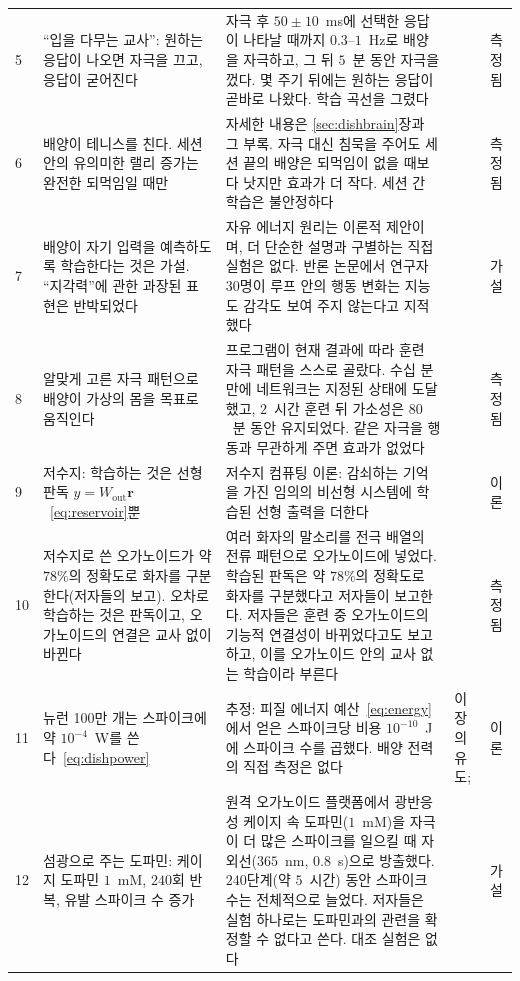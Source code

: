 {\begin{longtable}{>{\raggedright}p{0.5cm}>{\raggedright}p{4.0cm}>{\raggedright}p{5.6cm}>{\raggedright}p{2.3cm}>{\raggedright\arraybackslash}p{1.7cm}}
5 & “입을 다무는 교사”: 원하는 응답이 나오면 자극을 끄고, 응답이 굳어진다 & 자극 후 $50\pm10$~ms에 선택한 응답이 나타날 때까지 $0.3$--$1$~Hz로 배양을 자극하고, 그 뒤 $5$~분 동안 자극을 껐다. 몇 주기 뒤에는 원하는 응답이 곧바로 나왔다. 학습 곡선을 그렸다 & \cite{Shahaf2001} & 측정됨 \\
6 & 배양이 테니스를 친다. 세션 안의 유의미한 랠리 증가는 완전한 되먹임일 때만 & 자세한 내용은 \ref{sec:dishbrain}장과 그 부록. 자극 대신 침묵을 주어도 세션 끝의 배양은 되먹임이 없을 때보다 낫지만 효과가 더 작다. 세션 간 학습은 불안정하다 & \cite{Kagan2022} & 측정됨 \\
7 & 배양이 자기 입력을 예측하도록 학습한다는 것은 가설. “지각력”에 관한 과장된 표현은 반박되었다 & 자유 에너지 원리는 이론적 제안이며, 더 단순한 설명과 구별하는 직접 실험은 없다. 반론 논문에서 연구자 30명이 루프 안의 행동 변화는 지능도 감각도 보여 주지 않는다고 지적했다 & \cite{Friston2010,Balci2023} & 가설 \\
8 & 알맞게 고른 자극 패턴으로 배양이 가상의 몸을 목표로 움직인다 & 프로그램이 현재 결과에 따라 훈련 자극 패턴을 스스로 골랐다. 수십 분 만에 네트워크는 지정된 상태에 도달했고, $2$~시간 훈련 뒤 가소성은 $80$~분 동안 유지되었다. 같은 자극을 행동과 무관하게 주면 효과가 없었다 & \cite{Bakkum2008} & 측정됨 \\
9 & 저수지: 학습하는 것은 선형 판독 $y=W_{\text{out}}\mathbf r$~\eqref{eq:reservoir}뿐 & 저수지 컴퓨팅 이론: 감쇠하는 기억을 가진 임의의 비선형 시스템에 학습된 선형 출력을 더한다 & \cite{Maass2002,JaegerHaas2004} & 이론 \\
10 & 저수지로 쓴 오가노이드가 약 $78\%$의 정확도로 화자를 구분한다(저자들의 보고). 오차로 학습하는 것은 판독이고, 오가노이드의 연결은 교사 없이 바뀐다 & 여러 화자의 말소리를 전극 배열의 전류 패턴으로 오가노이드에 넣었다. 학습된 판독은 약 $78\%$의 정확도로 화자를 구분했다고 저자들이 보고한다. 저자들은 훈련 중 오가노이드의 기능적 연결성이 바뀌었다고도 보고하고, 이를 오가노이드 안의 교사 없는 학습이라 부른다 & \cite{Cai2023} & 측정됨 \\
11 & 뉴런 100만 개는 스파이크에 약 $10^{-4}$~W를 쓴다~\eqref{eq:dishpower} & 추정: 피질 에너지 예산~\eqref{eq:energy}에서 얻은 스파이크당 비용 $10^{-10}$~J에 스파이크 수를 곱했다. 배양 전력의 직접 측정은 없다 & 이 장의 유도; \cite{Attwell2001} & 이론 \\
12 & 섬광으로 주는 도파민: 케이지 도파민 $1$~mM, $240$회 반복, 유발 스파이크 수 증가 & 원격 오가노이드 플랫폼에서 광반응성 케이지 속 도파민($1$~mM)을 자극이 더 많은 스파이크를 일으킬 때 자외선($365$~nm, $0.8$~s)으로 방출했다. $240$단계(약 $5$~시간) 동안 스파이크 수는 전체적으로 늘었다. 저자들은 실험 하나로는 도파민과의 관련을 확정할 수 없다고 쓴다. 대조 실험은 없다 & \cite{Jordan2024} & 가설 \\

\end{longtable}}
